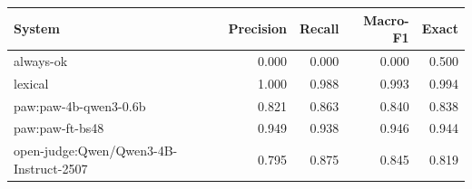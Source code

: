 \begin{tabular}{lrrrr}
\toprule
System & Precision & Recall & Macro-F1 & Exact \\
\midrule
always-ok & 0.000 & 0.000 & 0.000 & 0.500 \\
lexical & 1.000 & 0.988 & 0.993 & 0.994 \\
paw:paw-4b-qwen3-0.6b & 0.821 & 0.863 & 0.840 & 0.838 \\
paw:paw-ft-bs48 & 0.949 & 0.938 & 0.946 & 0.944 \\
open-judge:Qwen/Qwen3-4B-Instruct-2507 & 0.795 & 0.875 & 0.845 & 0.819 \\
\bottomrule
\end{tabular}
